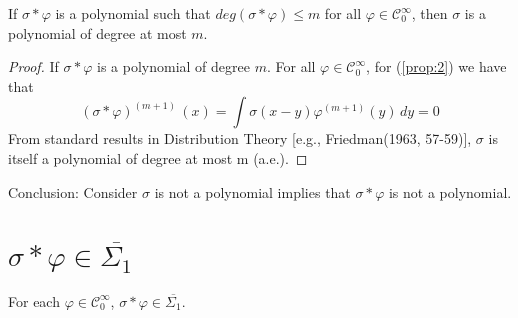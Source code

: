 \documentclass[../main.tex]{subfiles}
\begin{document}
	\begin{lema} %
		If $\sigma \ast \varphi$ is a polynomial such that $ deg (\sigma \ast \varphi) \leq m$ for all $\varphi \in \mathcal{C}^\infty_0$, then $\sigma$ is a polynomial of degree at most $m$. 
	\end{lema}
	\begin{proof} 
	If $\sigma \ast \varphi$ is a polynomial of degree $m$.
	For all $\varphi \in \mathcal{C}^\infty_0$, for (\ref{prop:2}) we have that
	$$(\sigma \ast \varphi)^{(m+1)} \, (x)=\int \sigma(x-y)\varphi^{(m+1)}(y) \, dy= 0$$  
	From standard results in Distribution Theory [e.g., Friedman(1963, 57-59)], $\sigma $ is itself a polynomial of degree at most m (a.e.).
	\end{proof} 
\noindent Conclusion: Consider $\sigma$ is not a polynomial implies that $\sigma \ast \varphi$ is not a polynomial. 


\section{$\sigma \ast \varphi \in \overline{\Sigma_1}$}
	\begin{lema} %
		For each $\varphi \in  \mathcal{C}^\infty_0$, $ \sigma \ast \varphi \in  \overline{\Sigma_1}$. 
		
	\end{lema}
	
\end{document}
